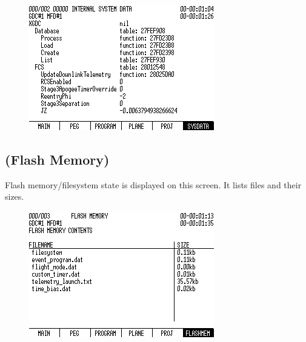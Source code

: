 \begin{figure}[htb]
\centering
\includegraphics[bb=0 0 9cm 7cm,scale=0.50]{../graphics/rv550_screen5.png}
\end{figure}

\subsection{ (Flash Memory)}
Flash memory/filesystem state is displayed on this screen. It lists files and their sizes.

\begin{figure}[htb]
\centering
\includegraphics[bb=0 0 9cm 7cm,scale=0.50]{../graphics/rv550_screen6.png}
\end{figure}

